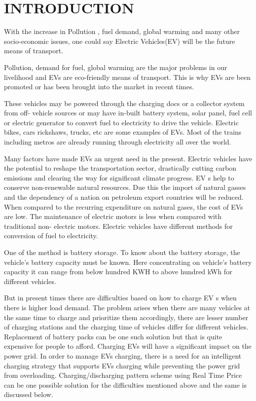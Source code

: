 	\chapter{INTRODUCTION}
	\label{chap:intro}
	
	
	With the increase in Pollution , fuel demand, global warming and many other socio-economic issues, one could say Electric Vehicles(EV) will be the future means of transport.

Pollution, demand for fuel, global warming are the major problems in our livelihood and EVs
are eco-friendly means of transport. This is why EVs are been promoted or has been brought
into the market in recent times.

These vehicles may be powered through the charging docs or a
collector system from off- vehicle sources or may have in-built battery system, solar panel,
fuel cell or electric generator to convert fuel to electricity to drive the vehicle. Electric bikes,
cars rickshaws, trucks, etc are some examples of EVs. Most of the trains including metros are
already running through electricity all over the world.

Many factors have made EVs an urgent need in the present. Electric vehicles have the potential to
reshape the transportation sector, drastically cutting carbon emissions and clearing the way
for significant climate progress. EV s help to conserve non-renewable natural resources. Due
this the import of natural gasses and the dependency of a nation on petroleum export countries
will be reduced. When compared to the recurring expenditure on natural gases, the cost of
EVs are low. The maintenance of electric motors is less when compared with traditional non-
electric motors. Electric vehicles have different methods for conversion of fuel to electricity.

One of the method is battery storage. To know about the battery storage, the vehicle’s battery
capacity must be known. Here concentrating on vehicle’s battery capacity it can range from
below hundred KWH to above hundred kWh for different vehicles.

But in present times there are difficulties based on how to charge EV s when there is higher
load demand. The problem arises when there are many vehicles at the same time to charge
and prioritize them accordingly, there are lesser number of charging stations and the charging
time of vehicles differ for different vehicles. Replacement of battery packs can be one such
solution but that is quite expensive for people to afford. Charging EVs will have a significant
impact on the power grid. In order to manage EVs charging, there is a need for an intelligent
charging strategy that supports EVs charging while preventing the power grid from
overloading. Charging/discharging pattern scheme using Real Time Price can be one possible
solution for the difficulties mentioned above and the same is discussed below.

